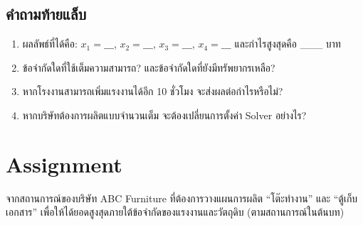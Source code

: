 \subsection*{คำถามท้ายแล็บ}
\begin{enumerate}[label=\alph*.]
    \item ผลลัพธ์ที่ได้คือ: $x_1 = \_\_\_$, $x_2 = \_\_\_$, $x_3 = \_\_\_$, $x_4 = \_\_\_$ และกำไรสูงสุดคือ \_\_\_ บาท
    \item ข้อจำกัดใดที่ใช้เต็มความสามารถ? และข้อจำกัดใดที่ยังมีทรัพยากรเหลือ?
    \item หากโรงงานสามารถเพิ่มแรงงานได้อีก 10 ชั่วโมง จะส่งผลต่อกำไรหรือไม่?
    \item หากบริษัทต้องการผลิตแบบจำนวนเต็ม จะต้องเปลี่ยนการตั้งค่า Solver อย่างไร?
\end{enumerate}
\newpage

\section*{Assignment}

จากสถานการณ์ของบริษัท ABC Furniture ที่ต้องการวางแผนการผลิต “โต๊ะทำงาน” และ “ตู้เก็บเอกสาร” เพื่อให้ได้ยอดสูงสุดภายใต้ข้อจำกัดของแรงงานและวัตถุดิบ (ตามสถานการณ์ในต้นบท)

